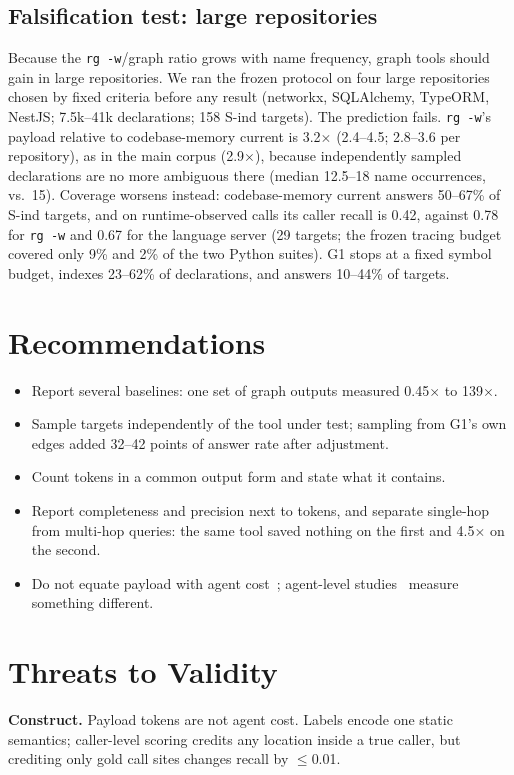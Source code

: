 \documentclass[conference]{IEEEtran}
\newcommand{\rg}{\texttt{rg\,-w}\xspace}
\newcommand{\cbm}{codebase-memory\xspace}
\begin{document}
\subsection{Falsification test: large repositories}
Because the \rg/graph ratio grows with name frequency, graph tools should gain in large repositories.
We ran the frozen protocol on four large repositories chosen by fixed criteria before any result (networkx, SQLAlchemy, TypeORM, NestJS; 7.5k--41k declarations; 158 S-ind targets).
The prediction fails.
\rg's payload relative to \cbm current is 3.2$\times$ (2.4--4.5; 2.8--3.6 per repository), as in the main corpus (2.9$\times$), because independently sampled declarations are no more ambiguous there (median 12.5--18 name occurrences, vs.\ 15).
Coverage worsens instead: \cbm current answers 50--67\% of S-ind targets, and on runtime-observed calls its caller recall is 0.42, against 0.78 for \rg and 0.67 for the language server (29 targets; the frozen tracing budget covered only 9\% and 2\% of the two Python suites).
G1 stops at a fixed symbol budget, indexes 23--62\% of declarations, and answers 10--44\% of targets.

\section{Recommendations}
\begin{itemize}
\item Report several baselines: one set of graph outputs measured 0.45$\times$ to 139$\times$.
\item Sample targets independently of the tool under test; sampling from G1's own edges added 32--42 points of answer rate after adjustment.
\item Count tokens in a common output form and state what it contains.
\item Report completeness and precision next to tokens, and separate single-hop from multi-hop queries: the same tool saved nothing on the first and 4.5$\times$ on the second.
\item Do not equate payload with agent cost~\cite{bai_tokens,weinberger}; agent-level studies~\cite{codebasememory,xu_lsp,codenib} measure something different.
\end{itemize}

\section{Threats to Validity}
\label{sec:threats}
\textbf{Construct.}
Payload tokens are not agent cost.
Labels encode one static semantics; caller-level scoring credits any location inside a true caller, but crediting only gold call sites changes recall by $\le$0.01.
\end{document}
